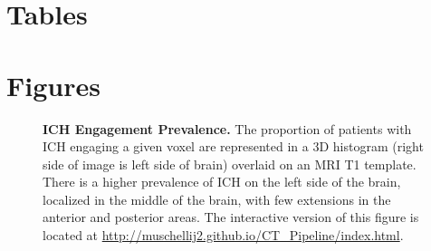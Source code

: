 \section{Tables}


%







%





\clearpage
\newpage

\section{Figures}

\setcounter{figure}{0}


\begin{figure}[H]
\centering
\caption[{\bf ICH Engagement Prevalence.}]{{\bf ICH Engagement Prevalence.} The proportion of patients with ICH engaging a given voxel are represented in a 3D histogram (right side of image is left side of brain) overlaid on an MRI T1 template. There is a higher prevalence of ICH on the left side of the brain, localized in the middle of the brain, with few extensions in the anterior and posterior areas. The interactive version of this figure is located at \url{http://muschellij2.github.io/CT_Pipeline/index.html}.}
  \label{fig:StrokeHist}
\end{figure}



